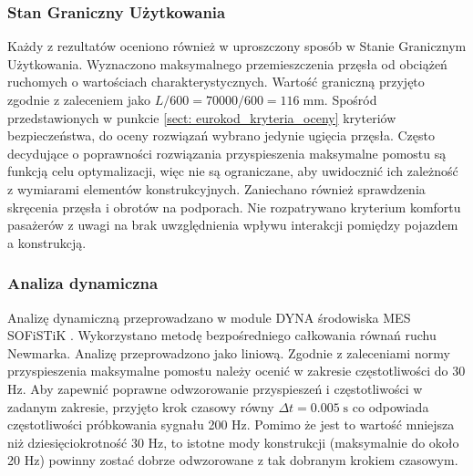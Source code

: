 \subsubsection{Stan Graniczny Użytkowania}
Każdy z rezultatów oceniono również w uproszczony sposób w Stanie Granicznym Użytkowania. Wyznaczono maksymalnego przemieszczenia przęsła od obciążeń ruchomych o wartościach charakterystycznych. Wartość graniczną przyjęto zgodnie z zaleceniem \cite{PKNc} jako $L/600=70000/600=116\;\text{mm}$. Spośród przedstawionych w punkcie \ref{sect: eurokod_kryteria_oceny} kryteriów bezpieczeństwa, do oceny rozwiązań wybrano jedynie ugięcia przęsła. Często decydujące o poprawności rozwiązania przyspieszenia maksymalne pomostu są funkcją celu optymalizacji, więc nie są ograniczane, aby uwidocznić ich zależność z wymiarami elementów konstrukcyjnych. Zaniechano również sprawdzenia skręcenia przęsła i obrotów na podporach. Nie rozpatrywano kryterium komfortu pasażerów z uwagi na brak uwzględnienia wpływu interakcji pomiędzy pojazdem a konstrukcją.

\subsubsection{Analiza dynamiczna}
Analizę dynamiczną przeprowadzano w module DYNA środowiska MES SOFiSTiK \cite{SOFISTIK2018a}. Wykorzystano metodę bezpośredniego całkowania równań ruchu Newmarka. Analizę przeprowadzono jako liniową. Zgodnie z zaleceniami normy \cite{PKNc} przyspieszenia maksymalne pomostu należy ocenić w zakresie częstotliwości do 30 Hz. Aby zapewnić poprawne odwzorowanie przyspieszeń i częstotliwości w zadanym zakresie, przyjęto krok czasowy równy $\Delta t = 0.005\;\text{s}$ co odpowiada częstotliwości próbkowania sygnału 200 Hz. Pomimo że jest to wartość mniejsza niż dziesięciokrotność 30 Hz, to istotne mody konstrukcji (maksymalnie do około 20 Hz) powinny zostać dobrze odwzorowane z tak dobranym krokiem czasowym.

